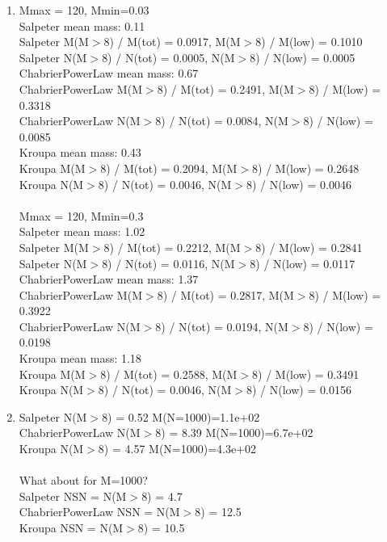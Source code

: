 \documentclass{article}
\begin{document}
\begin{enumerate}
\begin{enumerate}
\item %
    Mmax = 120, Mmin=0.03 \\
Salpeter mean mass: 0.11 \\
Salpeter M(M$>$8) / M(tot) = 0.0917, M(M$>$8) / M(low) = 0.1010 \\
Salpeter N(M$>$8) / N(tot) = 0.0005, N(M$>$8) / N(low) = 0.0005 \\
ChabrierPowerLaw mean mass: 0.67 \\
ChabrierPowerLaw M(M$>$8) / M(tot) = 0.2491, M(M$>$8) / M(low) = 0.3318 \\
ChabrierPowerLaw N(M$>$8) / N(tot) = 0.0084, N(M$>$8) / N(low) = 0.0085 \\
Kroupa mean mass: 0.43 \\
Kroupa M(M$>$8) / M(tot) = 0.2094, M(M$>$8) / M(low) = 0.2648 \\
Kroupa N(M$>$8) / N(tot) = 0.0046, N(M$>$8) / N(low) = 0.0046 \\
 \\
Mmax = 120, Mmin=0.3 \\
Salpeter mean mass: 1.02 \\
Salpeter M(M$>$8) / M(tot) = 0.2212, M(M$>$8) / M(low) = 0.2841 \\
Salpeter N(M$>$8) / N(tot) = 0.0116, N(M$>$8) / N(low) = 0.0117 \\
ChabrierPowerLaw mean mass: 1.37 \\
ChabrierPowerLaw M(M$>$8) / M(tot) = 0.2817, M(M$>$8) / M(low) = 0.3922 \\
ChabrierPowerLaw N(M$>$8) / N(tot) = 0.0194, N(M$>$8) / N(low) = 0.0198 \\
Kroupa mean mass: 1.18 \\
Kroupa M(M$>$8) / M(tot) = 0.2588, M(M$>$8) / M(low) = 0.3491 \\
Kroupa N(M$>$8) / N(tot) = 0.0046, N(M$>$8) / N(low) = 0.0156 

\item %
Salpeter          N(M$>$8) = 0.52  M(N=1000)=1.1e+02\\
ChabrierPowerLaw  N(M$>$8) = 8.39  M(N=1000)=6.7e+02\\
Kroupa            N(M$>$8) = 4.57  M(N=1000)=4.3e+02\\
\\
What about for M=1000? \\
Salpeter          NSN = N(M$>$8) = 4.7\\
ChabrierPowerLaw  NSN = N(M$>$8) = 12.5\\
Kroupa            NSN = N(M$>$8) = 10.5



\end{enumerate}
\end{enumerate}
\end{document}
